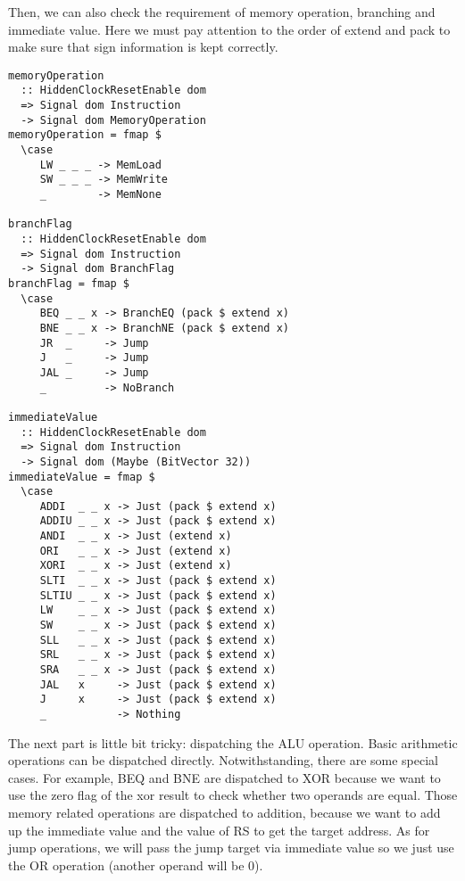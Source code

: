 Then, we can also check the requirement of memory operation, branching and immediate value. Here we must pay attention to the order of extend and pack to make sure that sign information is kept correctly.
\begin{verbatim}
memoryOperation 
  :: HiddenClockResetEnable dom
  => Signal dom Instruction
  -> Signal dom MemoryOperation
memoryOperation = fmap $ 
  \case
     LW _ _ _ -> MemLoad
     SW _ _ _ -> MemWrite
     _        -> MemNone

branchFlag 
  :: HiddenClockResetEnable dom
  => Signal dom Instruction
  -> Signal dom BranchFlag
branchFlag = fmap $
  \case 
     BEQ _ _ x -> BranchEQ (pack $ extend x)
     BNE _ _ x -> BranchNE (pack $ extend x)
     JR  _     -> Jump
     J   _     -> Jump
     JAL _     -> Jump
     _         -> NoBranch

immediateValue 
  :: HiddenClockResetEnable dom
  => Signal dom Instruction
  -> Signal dom (Maybe (BitVector 32))
immediateValue = fmap $
  \case 
     ADDI  _ _ x -> Just (pack $ extend x)
     ADDIU _ _ x -> Just (pack $ extend x)
     ANDI  _ _ x -> Just (extend x)
     ORI   _ _ x -> Just (extend x)
     XORI  _ _ x -> Just (extend x)
     SLTI  _ _ x -> Just (pack $ extend x)
     SLTIU _ _ x -> Just (pack $ extend x)
     LW    _ _ x -> Just (pack $ extend x)
     SW    _ _ x -> Just (pack $ extend x)
     SLL   _ _ x -> Just (pack $ extend x)
     SRL   _ _ x -> Just (pack $ extend x)
     SRA   _ _ x -> Just (pack $ extend x)
     JAL   x     -> Just (pack $ extend x)
     J     x     -> Just (pack $ extend x)
     _           -> Nothing
\end{verbatim}
The next part is little bit tricky: dispatching the ALU operation. Basic arithmetic operations can be dispatched directly. Notwithstanding, there are some special cases. For example, BEQ and BNE are dispatched to XOR because we want to use the zero flag of the xor result to check whether two operands are equal. Those memory related operations are dispatched to addition, because we want to add up the immediate value and the value of RS to get the target address. As for jump operations, we will pass the jump target via immediate value so we just use the OR operation (another operand will be 0).  
